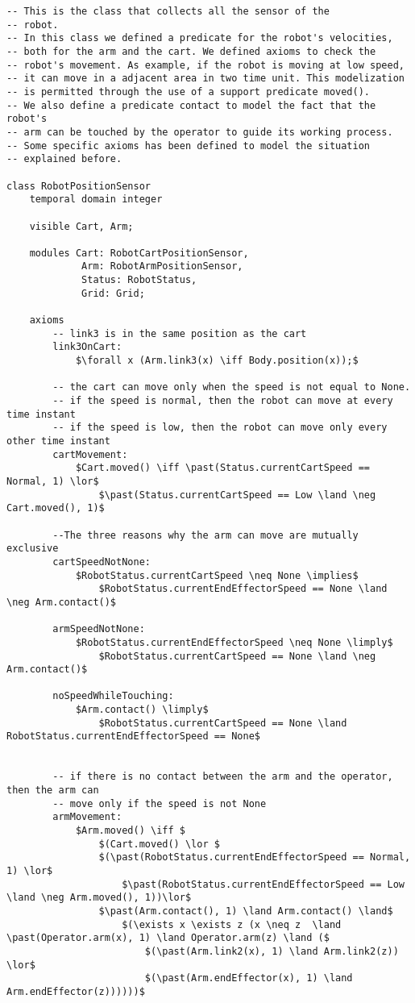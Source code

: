 \begin{lstlisting}[fontadjust, mathescape, frame=single] 
-- This is the class that collects all the sensor of the
-- robot.
-- In this class we defined a predicate for the robot's velocities,
-- both for the arm and the cart. We defined axioms to check the
-- robot's movement. As example, if the robot is moving at low speed,
-- it can move in a adjacent area in two time unit. This modelization
-- is permitted through the use of a support predicate moved().
-- We also define a predicate contact to model the fact that the robot's
-- arm can be touched by the operator to guide its working process.
-- Some specific axioms has been defined to model the situation
-- explained before.

class RobotPositionSensor
    temporal domain integer

    visible Cart, Arm;

    modules Cart: RobotCartPositionSensor,
             Arm: RobotArmPositionSensor,
             Status: RobotStatus,
             Grid: Grid;

    axioms
        -- link3 is in the same position as the cart
        link3OnCart: 
            $\forall x (Arm.link3(x) \iff Body.position(x));$

        -- the cart can move only when the speed is not equal to None.
        -- if the speed is normal, then the robot can move at every time instant
        -- if the speed is low, then the robot can move only every other time instant
        cartMovement:
            $Cart.moved() \iff \past(Status.currentCartSpeed == Normal, 1) \lor$
                $\past(Status.currentCartSpeed == Low \land \neg Cart.moved(), 1)$
            
        --The three reasons why the arm can move are mutually exclusive
        cartSpeedNotNone:
            $RobotStatus.currentCartSpeed \neq None \implies$
                $RobotStatus.currentEndEffectorSpeed == None \land \neg Arm.contact()$
        
        armSpeedNotNone:
            $RobotStatus.currentEndEffectorSpeed \neq None \limply$
                $RobotStatus.currentCartSpeed == None \land \neg Arm.contact()$
        
        noSpeedWhileTouching:
            $Arm.contact() \limply$
                $RobotStatus.currentCartSpeed == None \land RobotStatus.currentEndEffectorSpeed == None$


        -- if there is no contact between the arm and the operator, then the arm can
        -- move only if the speed is not None
        armMovement:
            $Arm.moved() \iff $
                $(Cart.moved() \lor $
                $(\past(RobotStatus.currentEndEffectorSpeed == Normal, 1) \lor$ 
                    $\past(RobotStatus.currentEndEffectorSpeed == Low \land \neg Arm.moved(), 1))\lor$
                $\past(Arm.contact(), 1) \land Arm.contact() \land$
                    $(\exists x \exists z (x \neq z  \land \past(Operator.arm(x), 1) \land Operator.arm(z) \land ($
                        $(\past(Arm.link2(x), 1) \land Arm.link2(z)) \lor$
                        $(\past(Arm.endEffector(x), 1) \land Arm.endEffector(z))))))$


\end{lstlisting}
